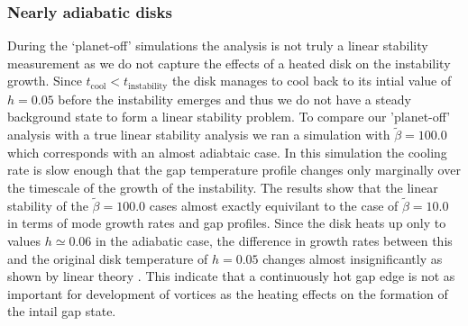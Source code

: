 \subsubsection{Nearly adiabatic disks}
\label{adiabatic_section}
During the `planet-off' simulations the analysis is not truly a linear stability measurement as we do not capture the effects of a heated disk on the instability growth. Since $t_{\mathrm{cool}}<t_{\mathrm{instability}}$ the disk manages to cool back to its intial value of $h=0.05$ before the instability emerges and thus we do not have a steady background state to form a linear stability problem. To compare our 'planet-off' analysis with a true linear stability analysis we ran a simulation  with $\tilde{\beta}=100.0$ which corresponds with an almost adiabtaic case. In this simulation the cooling rate is slow enough that the gap temperature profile changes only marginally over the timescale of the growth of the instability. The results show that the linear stability of the $\tilde{\beta}=100.0$ cases almost exactly equivilant to the case of $\tilde{\beta}=10.0$ in terms of mode growth rates and gap profiles. Since the disk heats up only to values $h\simeq0.06$ in the adiabatic case, the difference in growth rates between this and the original disk temperature of $h=0.05$ changes almost insignificantly as shown by linear theory \citep{li00}. This indicate that a continuously hot gap edge is not as important for development of vortices as the heating effects on the formation of the intail gap state.



